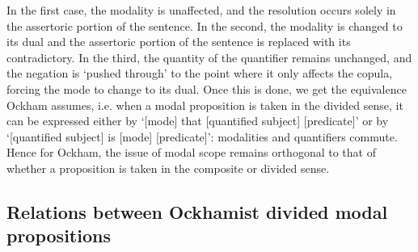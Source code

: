 \documentclass[]{article}
\begin{document}
In the first case, the modality is unaffected, and the resolution occurs solely in the assertoric portion of the sentence. In the second, the modality is changed to its dual and the assertoric portion of the sentence is replaced with its contradictory. In the third, the quantity of the quantifier remains unchanged, and the negation is `pushed through' to the point where it only affects the copula, forcing the mode to change to its dual. Once this is done, we get the equivalence Ockham assumes, i.e.  when a modal proposition is taken in the divided sense, it can be expressed either by `[mode] that [quantified subject] [predicate]' or by `[quantified subject] is [mode] [predicate]': modalities and quantifiers commute. Hence for Ockham, the issue of modal scope remains orthogonal to that of whether a proposition is taken in the composite or divided sense.
\subsection{Relations between Ockhamist divided modal propositions}
\end{document}
